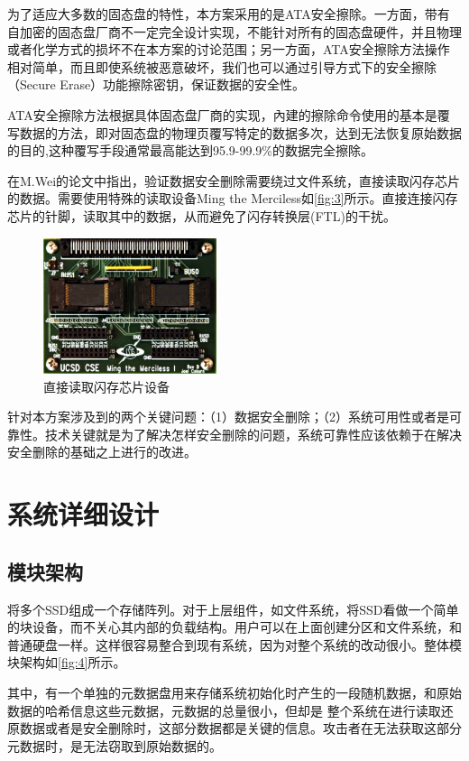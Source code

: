 为了适应大多数的固态盘的特性，本方案采用的是ATA安全擦除。一方面，带有自加密的固态盘厂商不一定完全设计实现，不能针对所有的固态盘硬件，并且物理或者化学方式的损坏不在本方案的讨论范围；另一方面，ATA安全擦除方法操作相对简单，而且即使系统被恶意破坏，我们也可以通过引导方式下的安全擦除（Secure Erase）功能擦除密钥，保证数据的安全性。


ATA安全擦除方法根据具体固态盘厂商的实现，內建的擦除命令使用的基本是覆写数据的方法，即对固态盘的物理页覆写特定的数据多次，达到无法恢复原始数据的目的,这种覆写手段通常最高能达到95.9-99.9\%的数据完全擦除\cite{Wei2011Reliably}。


在M.Wei的论文\cite{Wei2011Reliably}中指出，验证数据安全删除需要绕过文件系统，直接读取闪存芯片的数据。需要使用特殊的读取设备Ming the Merciless如\autoref{fig:3}所示。直接连接闪存芯片的针脚，读取其中的数据，从而避免了闪存转换层(FTL)的干扰。
\begin{figure}[H]
	\centering
	\includegraphics[width=2in]{Pics/ming.png}
	\caption{直接读取闪存芯片设备}
    \label{fig:3}
\end{figure}
针对本方案涉及到的两个关键问题：（1）数据安全删除；（2）系统可用性或者是可靠性。技术关键就是为了解决怎样安全删除的问题，系统可靠性应该依赖于在解决安全删除的基础之上进行的改进。
\section{系统详细设计}
\subsection{模块架构}
将多个SSD组成一个存储阵列。对于上层组件，如文件系统，将SSD看做一个简单的块设备，而不关心其内部的负载结构。用户可以在上面创建分区和文件系统，和普通硬盘一样。这样很容易整合到现有系统，因为对整个系统的改动很小。整体模块架构如\autoref{fig:4}所示。


其中，有一个单独的元数据盘用来存储系统初始化时产生的一段随机数据，和原始数据的哈希信息这些元数据，元数据的总量很小，但却是
整个系统在进行读取还原数据或者是安全删除时，这部分数据都是关键的信息。攻击者在无法获取这部分元数据时，是无法窃取到原始数据的。


